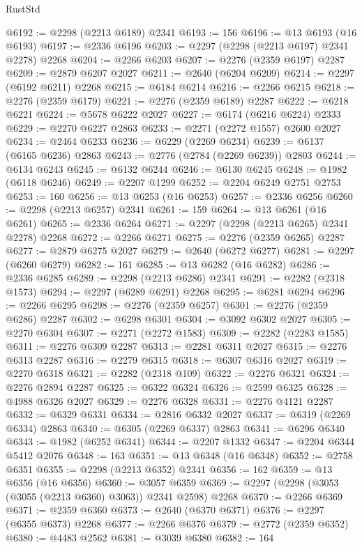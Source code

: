 \begin{lexlean}{RustStd}
\begin{coremodule}
@6192 := @2298 (@2213 @6189) @2341
@6193 := 156
@6196 := @13 @6193 (@16 @6193)
@6197 := @2336 @6196
@6203 := @2297 (@2298 (@2213 @6197) @2341 @2278) @2268
@6204 := @2266 @6203
@6207 := @2276 (@2359 @6197) @2287
@6209 := @2879 @6207 @2027
@6211 := @2640 (@6204 @6209)
@6214 := @2297 (@6192 @6211) @2268
@6215 := @6184 @6214
@6216 := @2266 @6215
@6218 := @2276 (@2359 @6179)
@6221 := @2276 (@2359 @6189) @2287
@6222 := @6218 @6221
@6224 := @5678 @6222 @2027
@6227 := @6174 (@6216 @6224) @2333
@6229 := @2270 @6227 @2863
@6233 := @2271 (@2272 @1557) @2600 @2027
@6234 := @2464 @6233
@6236 := @6229 (@2269 @6234)
@6239 := @6137 (@6165 @6236) @2863
@6243 := @2776 (@2784 (@2269 @6239)) @2803
@6244 := @6134 @6243
@6245 := @6132 @6244
@6246 := @6130 @6245
@6248 := @1982 (@6118 @6246)
@6249 := @2207 @1299
@6252 := @2204 @6249 @2751 @2753
@6253 := 160
@6256 := @13 @6253 (@16 @6253)
@6257 := @2336 @6256
@6260 := @2298 (@2213 @6257) @2341
@6261 := 159
@6264 := @13 @6261 (@16 @6261)
@6265 := @2336 @6264
@6271 := @2297 (@2298 (@2213 @6265) @2341 @2278) @2268
@6272 := @2266 @6271
@6275 := @2276 (@2359 @6265) @2287
@6277 := @2879 @6275 @2027
@6279 := @2640 (@6272 @6277)
@6281 := @2297 (@6260 @6279)
@6282 := 161
@6285 := @13 @6282 (@16 @6282)
@6286 := @2336 @6285
@6289 := @2298 (@2213 @6286) @2341
@6291 := @2282 (@2318 @1573)
@6294 := @2297 (@6289 @6291) @2268
@6295 := @6281 @6294
@6296 := @2266 @6295
@6298 := @2276 (@2359 @6257)
@6301 := @2276 (@2359 @6286) @2287
@6302 := @6298 @6301
@6304 := @3092 @6302 @2027
@6305 := @2270 @6304
@6307 := @2271 (@2272 @1583)
@6309 := @2282 (@2283 @1585)
@6311 := @2276 @6309 @2287
@6313 := @2281 @6311 @2027
@6315 := @2276 @6313 @2287
@6316 := @2279 @6315
@6318 := @6307 @6316 @2027
@6319 := @2270 @6318
@6321 := @2282 (@2318 @109)
@6322 := @2276 @6321
@6324 := @2276 @2894 @2287
@6325 := @6322 @6324
@6326 := @2599 @6325
@6328 := @4988 @6326 @2027
@6329 := @2276 @6328
@6331 := @2276 @4121 @2287
@6332 := @6329 @6331
@6334 := @2816 @6332 @2027
@6337 := @6319 (@2269 @6334) @2863
@6340 := @6305 (@2269 @6337) @2863
@6341 := @6296 @6340
@6343 := @1982 (@6252 @6341)
@6344 := @2207 @1332
@6347 := @2204 @6344 @5412 @2076
@6348 := 163
@6351 := @13 @6348 (@16 @6348)
@6352 := @2758 @6351
@6355 := @2298 (@2213 @6352) @2341
@6356 := 162
@6359 := @13 @6356 (@16 @6356)
@6360 := @3057 @6359
@6369 := @2297 (@2298 (@3053 (@3055 (@2213 @6360) @3063)) @2341 @2598) @2268
@6370 := @2266 @6369
@6371 := @2359 @6360
@6373 := @2640 (@6370 @6371)
@6376 := @2297 (@6355 @6373) @2268
@6377 := @2266 @6376
@6379 := @2772 (@2359 @6352)
@6380 := @4483 @2562
@6381 := @3039 @6380
@6382 := 164

\end{coremodule}
\end{lexlean}
